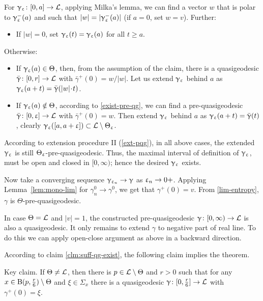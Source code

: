 For $\gamma_\eps\:[0,a]\to \spc{L}$, applying Milka's lemma, we can find a vector $w$ that is polar to $\upgamma_\upvarepsilon^-(a)$ and such that $|w|=|\upgamma_\upvarepsilon^-(a)|$ (if $a=0$, set $w=v$). 
Further:
\begin{itemize}
\item If $|w|=0$, set $\upgamma_\upvarepsilon(t)=\upgamma_\upvarepsilon(a)$ for all $t\ge a$. 
\end{itemize}
Otherwise:
\begin{itemize}
\item If $\gamma_\eps(a)\in\Theta$, then, from the assumption of the claim, there is a quasigeodesic $\bar\gamma\:[0,r]\to \spc{L}$ with $\bar\gamma^+(0)=w/|w|$.
Let us extend $\upgamma_\upvarepsilon$ behind $a$ as $\gamma_\eps(a+t)=\bar\gamma(|w|\cdot t)$.
\item If $\upgamma_\upvarepsilon(a)\notin\Theta$, according to \ref{exist-pre-qg},
we can find a pre-quasigeodesic $\bar\gamma\:[0,\eps]\to \spc{L}$ with $\bar\gamma^+(0)=w$.
Then extend $\upgamma_\upvarepsilon$ behind $a$ as $\upgamma_\upvarepsilon(a+t)=\bar{\upgamma}(t)$, clearly $\gamma_\eps([a,a+\eps])\subset \spc{L}\setminus\Theta_\eps$.
\end{itemize}
According to extension procedure II (\ref{ext-pqg}), in all above cases, the extended $\upgamma_\upvarepsilon$ is still $\Theta_\upvarepsilon$-pre-\nospace quasigeodesic.
Thus, the maximal interval of definition of $\upgamma_\upvarepsilon$, must be open and closed in $[0,\infty)$;
hence the desired $\upgamma_\upvarepsilon$ exists.

Now take a converging sequence $\gamma_{\eps_n}\to\gamma$ as $\eps_n\to0+$.
Applying Lemma~\ref{lem:mono-lim} for $\gamma_n^0\to\gamma^0$, we get that $\gamma^+(0)=v$.
From \ref{lim-entropy}, $\gamma$ is $\Theta$-pre-quasigeodesic.

In case $\Theta=\mathcal{L}$ and $|v|=1$, the constructed pre-quasigeodesic $\gamma\:[0,\infty)\to \spc{L}$
is also a quasigeodesic.
It only remains to extend $\gamma$ to negative part of real line.
To do this we can apply open-close argument as above in a backward direction.
\claimqeds

According to claim \ref{clm:suff-qg-exist}, the following claim implies the theorem.

\begin{clm}{Key claim.}\label{clm:qg-main}
If $\Theta\not=\mathcal{L}$, then there is $p\in \spc{L}\setminus \Theta$ and $r>0$ such that for any $x\in\oBall(p,\tfrac{r}{6})\setminus \Theta$ and $\xi\in \Sigma_x$ there is a quasigeodesic $\gamma\:[0,\tfrac{r}{6}]\to \spc{L}$ with  $\gamma^+(0)=\xi$.
\end{clm}


